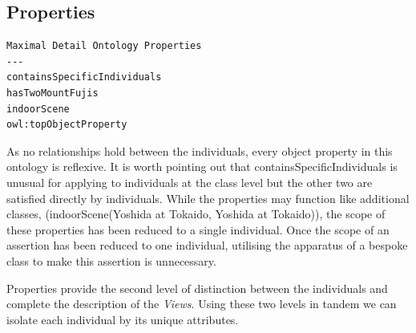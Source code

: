 \documentclass[titlepage,a4paper,12pt,oneside]{book}
\begin{document}
\subsection{Properties}
\begin{lstlisting}
Maximal Detail Ontology Properties
---
containsSpecificIndividuals
hasTwoMountFujis
indoorScene
owl:topObjectProperty
\end{lstlisting}
As no relationships hold between the individuals, every object property in this ontology is reflexive.
It is worth pointing out that containsSpecificIndividuals is unusual for applying to individuals at the class level but the other two are satisfied directly by individuals.
While the properties may function like additional classes, (indoorScene(Yoshida at Tokaido, Yoshida at Tokaido)), the scope of these properties has been reduced to a single individual.
Once the scope of an assertion has been reduced to one individual, utilising the apparatus of a bespoke class to make this assertion is unnecessary.\par
Properties provide the second level of distinction between the individuals and complete the description of the \textit{Views}.
Using these two levels in tandem we can isolate each individual by its unique attributes.
\end{document}
